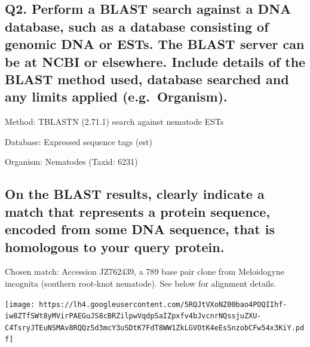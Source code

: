 \documentclass[
  letterpaper,
  DIV=11,
  numbers=noendperiod]{scrartcl}
\begin{document}
\hypertarget{q2.-perform-a-blast-search-against-a-dna-database-such-as-a-database-consisting-of-genomic-dna-or-ests.-the-blast-server-can-be-at-ncbi-or-elsewhere.-include-details-of-the-blast-method-used-database-searched-and-any-limits-applied-e.g.-organism.}{%
\subsection{\texorpdfstring{Q2. \textbf{Perform a BLAST search against a
DNA database, such as a database consisting of genomic DNA or ESTs. The
BLAST server can be at NCBI or elsewhere. Include details of the BLAST
method used, database searched and any limits applied
(e.g.~Organism).}}{Q2. Perform a BLAST search against a DNA database, such as a database consisting of genomic DNA or ESTs. The BLAST server can be at NCBI or elsewhere. Include details of the BLAST method used, database searched and any limits applied (e.g.~Organism).}}\label{q2.-perform-a-blast-search-against-a-dna-database-such-as-a-database-consisting-of-genomic-dna-or-ests.-the-blast-server-can-be-at-ncbi-or-elsewhere.-include-details-of-the-blast-method-used-database-searched-and-any-limits-applied-e.g.-organism.}}

Method: TBLASTN (2.71.1) search against nematode ESTs

Database: Expressed sequence tags (est)

Organism: Nematodes (Taxid: 6231)

\hypertarget{on-the-blast-results-clearly-indicate-a-match-that-represents-a-protein-sequence-encoded-from-some-dna-sequence-that-is-homologous-to-your-query-protein.}{%
\subsection{\texorpdfstring{\textbf{On the BLAST results, clearly
indicate a match that represents a protein sequence, encoded from some
DNA sequence, that is homologous to your query
protein.}}{On the BLAST results, clearly indicate a match that represents a protein sequence, encoded from some DNA sequence, that is homologous to your query protein.}}\label{on-the-blast-results-clearly-indicate-a-match-that-represents-a-protein-sequence-encoded-from-some-dna-sequence-that-is-homologous-to-your-query-protein.}}

Chosen match: Accession JZ762439, a 789 base pair clone from Meloidogyne
incognita (southern root-knot nematode). See below for alignment
details.

\texttt{[image: https://lh4.googleusercontent.com/5RQJtVXoNZ00bao4POQIIhf-iw8ZTfSWt8yMVirPAEGuJS8cBRZilpwVqdpSaIZpxfv4bJvcnrNQssjuZXU-C4TsryJTEuNSMAv8RQQz5d3mcY3uSDtK7FdT8WW1ZkLGVOtK4eEsSnzobCFw54x3KiY.pdf]}
\end{document}
